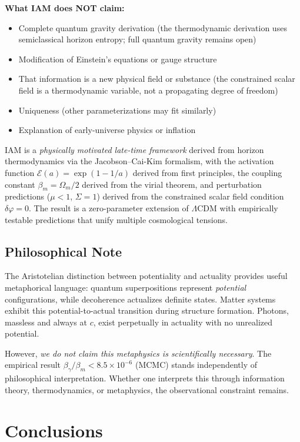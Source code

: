 \documentclass[twocolumn,superscriptaddress,prl,amsmath,amssymb]{revtex4-2}
\begin{document}
\textbf{What IAM does NOT claim:}
\begin{itemize}
\item Complete quantum gravity derivation (the thermodynamic derivation uses semiclassical horizon entropy; full quantum gravity remains open)
\item Modification of Einstein's equations or gauge structure
\item That information is a new physical field or substance (the constrained scalar field is a thermodynamic variable, not a propagating degree of freedom)
\item Uniqueness (other parameterizations may fit similarly)
\item Explanation of early-universe physics or inflation
\end{itemize}

IAM is a \textit{physically motivated late-time framework} derived from horizon thermodynamics via the Jacobson--Cai-Kim formalism, with the activation function $\mathcal{E}(a) = \exp(1-1/a)$ derived from first principles, the coupling constant $\beta_m = \Omega_m/2$ derived from the virial theorem, and perturbation predictions ($\mu < 1$, $\Sigma = 1$) derived from the constrained scalar field condition $\delta\varphi = 0$. The result is a zero-parameter extension of $\Lambda$CDM with empirically testable predictions that unify multiple cosmological tensions.

\subsection{Philosophical Note}

The Aristotelian distinction between potentiality and actuality provides useful metaphorical language: quantum superpositions represent \textit{potential} configurations, while decoherence actualizes definite states. Matter systems exhibit this potential-to-actual transition during structure formation. Photons, massless and always at $c$, exist perpetually in actuality with no unrealized potential.

However, \textit{we do not claim this metaphysics is scientifically necessary}. The empirical result $\beta_\gamma/\beta_m < 8.5 \times 10^{-6}$ (MCMC) stands independently of philosophical interpretation. Whether one interprets this through information theory, thermodynamics, or metaphysics, the observational constraint remains.

\section{Conclusions}
\end{document}
